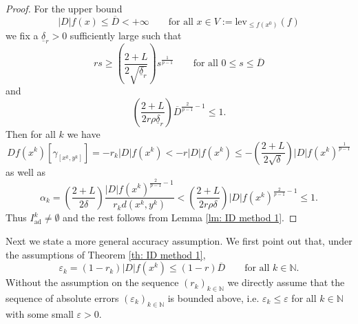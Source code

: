 \documentclass{article}
\theoremstyle{plain}\newtheorem{theorem}{Theorem}[section]
\theoremstyle{plain}\newtheorem{definition}[theorem]{Definition}
\theoremstyle{plain}\newtheorem{lemma}[theorem]{Lemma}
\theoremstyle{definition}\newtheorem{remark}[theorem]{Remark}
\theoremstyle{definition}\newtheorem{example}[theorem]{Example}
\theoremstyle{plain}\newtheorem{proposition}[theorem]{Proposition}
\theoremstyle{plain}\newtheorem{inference}[theorem]{Inference}
\theoremstyle{plain}\newtheorem{corollary}[theorem]{Corollary}
\theoremstyle{plain}\newtheorem{assumption}[theorem]{Assumption}
\newcommand{\bbN}{\mathbb{N}}
\begin{document}
\begin{proof}
    For the upper bound
    $$
    |D|f(x)\leq\overline{D}<+\infty \qquad\text{for all}\,\,x\in V:=\mathrm{lev}_{\leq f(x^0)}(f)
    $$
    we fix a $\underline{\delta}_r>0$ sufficiently large such that
    $$
    rs\geq\left(\frac{2+L}{2\sqrt{\underline{\delta}_r}}\right)s^{\frac{1}{p-1}} \qquad\text{for all}\,\,0\leq s\leq\overline{D}
    $$
    and
    $$
    \left(\frac{2+L}{2r\rho\underline{\delta}_r}\right)\overline{D}^{\frac{2}{p-1}-1}\leq 1.
    $$
    Then for all $k$ we have
    $$
    Df(x^k)[\gamma_{[x^k,y^k]}]=-r_k|D|f(x^k)<-r|D|f(x^k)\leq-\left(\frac{2+L}{2\sqrt{\delta}}\right)|D|f(x^k)^{\frac{1}{p-1}}
    $$
    as well as
    $$
    \alpha_k=\left(\frac{2+L}{2\delta}\right)\frac{|D|f(x^k)^{\frac{2}{p-1}-1}}{r_kd(x^k,y^k)}<\left(\frac{2+L}{2r\rho\delta}\right)|D|f(x^k)^{\frac{2}{p-1}-1}\leq 1.
    $$
    Thus $I^k_{\mathrm{ad}}\neq\emptyset$ and the rest follows from Lemma \ref{lm: ID method 1}.
\end{proof}
Next we state a more general accuracy assumption. We first point out that, under the assumptions of Theorem \ref{th: ID method 1},
$$
\varepsilon_k=(1-r_k)|D|f(x^k)\leq (1-r)\overline{D} \qquad\text{for all}\,\,k\in\bbN.
$$
Without the assumption on the sequence $(r_k)_{k\in\bbN}$ we directly assume that the sequence of absolute errors $(\varepsilon_k)_{k\in\bbN}$ is bounded above, i.e. $\varepsilon_k\leq\varepsilon$ for all $k\in\bbN$ with some small $\varepsilon>0$.
\end{document}
